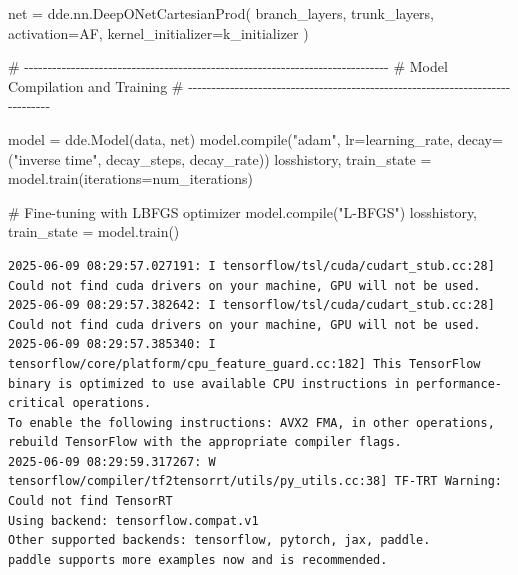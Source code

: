 \documentclass[
  spanish,
  us-letterpaper,
  DIV=11,
  numbers=noendperiod]{scrreprt}
\newenvironment{Shaded}{\begin{snugshade}}{\end{snugshade}}
\newcommand{\BuiltInTok}[1]{\textcolor[rgb]{0.00,0.23,0.31}{#1}}
\newcommand{\CommentTok}[1]{\textcolor[rgb]{0.37,0.37,0.37}{#1}}
\newcommand{\NormalTok}[1]{\textcolor[rgb]{0.00,0.23,0.31}{#1}}
\newcommand{\OperatorTok}[1]{\textcolor[rgb]{0.37,0.37,0.37}{#1}}
\newcommand{\StringTok}[1]{\textcolor[rgb]{0.13,0.47,0.30}{#1}}
\theoremstyle{definition}
\theoremstyle{plain}
\theoremstyle{remark}
\begin{document}
\begin{Shaded}
\begin{Highlighting}[]
\NormalTok{net }\OperatorTok{=}\NormalTok{ dde.nn.DeepONetCartesianProd(}
\NormalTok{    branch\_layers,}
\NormalTok{    trunk\_layers,}
\NormalTok{    activation}\OperatorTok{=}\NormalTok{AF,}
\NormalTok{    kernel\_initializer}\OperatorTok{=}\NormalTok{k\_initializer}
\NormalTok{)}

\CommentTok{\# {-}{-}{-}{-}{-}{-}{-}{-}{-}{-}{-}{-}{-}{-}{-}{-}{-}{-}{-}{-}{-}{-}{-}{-}{-}{-}{-}{-}{-}{-}{-}{-}{-}{-}{-}{-}{-}{-}{-}{-}{-}{-}{-}{-}{-}{-}{-}{-}{-}{-}{-}{-}{-}{-}{-}{-}{-}{-}{-}{-}{-}{-}{-}{-}{-}{-}{-}{-}{-}{-}{-}{-}{-}{-}{-}{-}{-}{-}}
\CommentTok{\# Model Compilation and Training}
\CommentTok{\# {-}{-}{-}{-}{-}{-}{-}{-}{-}{-}{-}{-}{-}{-}{-}{-}{-}{-}{-}{-}{-}{-}{-}{-}{-}{-}{-}{-}{-}{-}{-}{-}{-}{-}{-}{-}{-}{-}{-}{-}{-}{-}{-}{-}{-}{-}{-}{-}{-}{-}{-}{-}{-}{-}{-}{-}{-}{-}{-}{-}{-}{-}{-}{-}{-}{-}{-}{-}{-}{-}{-}{-}{-}{-}{-}{-}{-}{-}}

\NormalTok{model }\OperatorTok{=}\NormalTok{ dde.Model(data, net)}
\NormalTok{model.}\BuiltInTok{compile}\NormalTok{(}\StringTok{"adam"}\NormalTok{, lr}\OperatorTok{=}\NormalTok{learning\_rate, decay}\OperatorTok{=}\NormalTok{(}\StringTok{"inverse time"}\NormalTok{, decay\_steps, decay\_rate))}
\NormalTok{losshistory, train\_state }\OperatorTok{=}\NormalTok{ model.train(iterations}\OperatorTok{=}\NormalTok{num\_iterations)}

\CommentTok{\# Fine{-}tuning with LBFGS optimizer}
\NormalTok{model.}\BuiltInTok{compile}\NormalTok{(}\StringTok{"L{-}BFGS"}\NormalTok{)}
\NormalTok{losshistory, train\_state }\OperatorTok{=}\NormalTok{ model.train()}
\end{Highlighting}
\end{Shaded}

\begin{verbatim}
2025-06-09 08:29:57.027191: I tensorflow/tsl/cuda/cudart_stub.cc:28] Could not find cuda drivers on your machine, GPU will not be used.
2025-06-09 08:29:57.382642: I tensorflow/tsl/cuda/cudart_stub.cc:28] Could not find cuda drivers on your machine, GPU will not be used.
2025-06-09 08:29:57.385340: I tensorflow/core/platform/cpu_feature_guard.cc:182] This TensorFlow binary is optimized to use available CPU instructions in performance-critical operations.
To enable the following instructions: AVX2 FMA, in other operations, rebuild TensorFlow with the appropriate compiler flags.
2025-06-09 08:29:59.317267: W tensorflow/compiler/tf2tensorrt/utils/py_utils.cc:38] TF-TRT Warning: Could not find TensorRT
Using backend: tensorflow.compat.v1
Other supported backends: tensorflow, pytorch, jax, paddle.
paddle supports more examples now and is recommended.
\end{verbatim}
\end{document}

